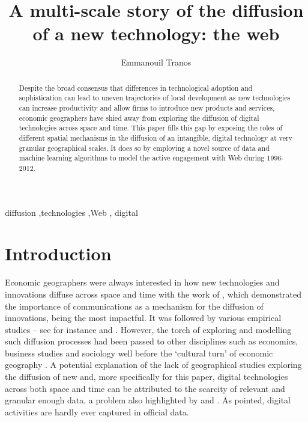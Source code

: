 \documentclass[
  authoryear,
  preprint,
  3p]{elsarticle}
\begin{document}
\begin{frontmatter}
\title{A multi-scale story of the diffusion of a new technology: the
web}
\author[1]{Emmanouil Tranos%
%
}



        
\begin{abstract}
Despite the broad consensus that differences in technological adoption
and sophistication can lead to uneven trajectories of local development
as new technologies can increase productivity and allow firms to
introduce new products and services, economic geographers have shied
away from exploring the diffusion of digital technologies across space
and time. This paper fills this gap by exposing the roles of different
spatial mechanisms in the diffusion of an intangible, digital technology
at very granular geographical scales. It does so by employing a novel
source of data and machine learning algorithms to model the active
engagement with Web during 1996-2012.
\end{abstract}





\begin{keyword}
    diffusion \sep technologies \sep Web \sep 
    digital
\end{keyword}
\end{frontmatter}
    

\section{Introduction}\label{sec-introduction}

Economic geographers were always interested in how new technologies and
innovations diffuse across space and time with the work of
\citet{hagerstrand1968innovation}, which demonstrated the importance of
communications as a mechanism for the diffusion of innovations, being
the most impactful. It was followed by various empirical studies -- see
for instance \citet{ormrod1990} and \citet{iso2005}. However, the torch
of exploring and modelling such diffusion processes had been passed to
other disciplines such as economics, business studies and sociology well
before the `cultural turn' of economic geography
\citep{perkins2005international}. A potential explanation of the lack of
geographical studies exploring the diffusion of new and, more
specifically for this paper, digital technologies across both space and
time can be attributed to the scarcity of relevant and granular enough
data, a problem also highlighted by \citet{iso2005} and
\citet{kemeny2011international}. As \citet{zook2022mapping} pointed,
digital activities are hardly ever captured in official data.
\end{document}
